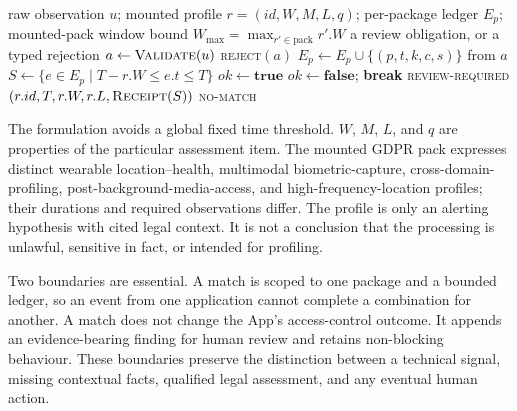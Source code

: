 \begin{algorithm}[H]
\caption{Fail-closed admission and bounded temporal matching}
\label{alg:temporal-match}
\begin{algorithmic}[1]
\Require raw observation $u$; mounted profile $r=(id,W,M,L,q)$; per-package ledger $E_p$; mounted-pack window bound $W_{\max}=\max_{r'\in\text{pack}} r'.W$
\Ensure a review obligation, or a typed rejection
\State $a \gets \Call{Validate}{u}$ 
  \State \Return \textsc{reject}$(a)$ 
\EndIf
\State $E_p \gets E_p \cup \{(p, t, k, c, s)\}$ from $a$
\State {} 
\State {} 
  \State $S \gets \{e \in E_p \mid T - r.W \le e.t \le T\}$
   
    \State $ok \gets \mathbf{true}$
        \State $ok \gets \mathbf{false}$; \textbf{break}
      \EndIf
    \EndFor
      \State \Return \textsc{review-required}$(r.id, T, r.W, r.L, \Call{Receipt}{S})$
    \EndIf
  \EndIf
\EndFor
\State \Return \textsc{no-match} 
\end{algorithmic}
\end{algorithm}

The formulation avoids a global fixed time threshold. $W$, $M$, $L$, and $q$ are properties of the particular assessment item. The mounted GDPR pack expresses distinct wearable location--health, multimodal biometric-capture, cross-domain-profiling, post-background-media-access, and high-frequency-location profiles; their durations and required observations differ. The profile is only an alerting hypothesis with cited legal context. It is not a conclusion that the processing is unlawful, sensitive in fact, or intended for profiling.

Two boundaries are essential. A match is scoped to one package and a bounded ledger, so an event from one application cannot complete a combination for another. A match does not change the App's access-control outcome. It appends an evidence-bearing finding for human review and retains non-blocking behaviour. These boundaries preserve the distinction between a technical signal, missing contextual facts, qualified legal assessment, and any eventual human action.

